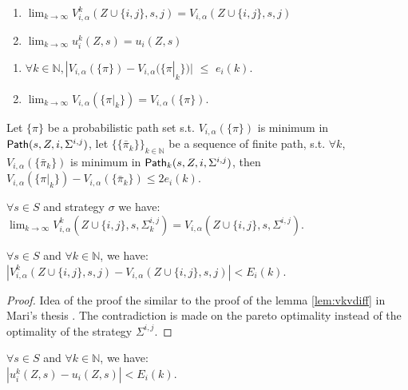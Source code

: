 \begin{proposition}\label{prop:limkvu}
	\begin{enumerate}
		\item $\lim_{k\to\infty} V_{i,\alpha}^{k}(Z\cup\{i,j\},s,j)=V_{i,\alpha}(Z\cup\{i,j\},s,j)$
		\item $\lim_{k\to\infty} u_i^{k}(Z,s)=u_i(Z,s)$
	\end{enumerate}
\end{proposition}
\begin{lemma}\label{lem:stlimvkpi}
	\begin{enumerate}
		\item $\forall k\in \mathbb{N}, |V_{i,\alpha}(\{\pi\})-V_{i,\alpha}(\{\pi|_k\})|$ $\le$ $e_i(k)$.	
		\item $\lim_{k\to\infty}  V_{i,\alpha}(\{\pi|_k\})=V_{i,\alpha}(\{\pi\})$.
	\end{enumerate}
\end{lemma}
\begin{lemma}\label{lem:stvdiff}
	Let $\{ \pi \}$ be a probabilistic path set s.t. $V_{i,\alpha}(\{\pi\})$ is minimum in ${\sf Path}(s,Z,i,\Sigma^{i,j})$, let $\{\{\bar\pi_k \} \}_{k \in \mathbb{N}}$ be a sequence of finite path, s.t. $\forall k$, $V_{i,\alpha}(\{\bar\pi_k   \})$ is minimum in ${\sf Path}_k(s,Z,i,\Sigma^{i,j})$, then $V_{i,\alpha}(\{\pi|_k\})-V_{i,\alpha}(\{\bar\pi_k\}) \le 2e_i(k)$.
\end{lemma}
\begin{lemma}\label{lem:stlimvkz}
	$\forall s\in S$ and strategy $\sigma$ we have:\\
	$\lim_{k\to\infty} V_{i,\alpha}^{k}(Z\cup\{i,j\},s,\Sigma^{i,j}_k) = V_{i,\alpha}(Z\cup\{i,j\},s,\Sigma^{i,j}) $.
\end{lemma}
\begin{lemma}\label{lem:stvkvdiff}
	$\forall  s\in S$ and $\forall k \in \mathbb{N}$, we have:\\
	$|V_{i,\alpha}^{k}(Z\cup\{i,j\},s,j)-V_{i,\alpha}(Z\cup\{i,j\},s,j)| < E_i(k)$.
\end{lemma}
\begin{proof}
	Idea of the proof the similar to the proof of the lemma \ref{lem:vkvdiff} in Mari's thesis \cite{MariPhD}. The contradiction is made on the pareto optimality instead of the optimality of the strategy $\Sigma^{i,j}$.
\end{proof}

\begin{lemma}\label{lem:stukudiff}
	$\forall s\in S$ and $\forall k \in \mathbb{N}$, we have: \\
	$|u_i^{k}(Z,s) - u_i(Z,s)| < E_i(k)$.
\end{lemma}


